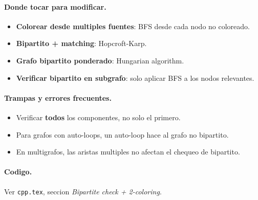 \paragraph{Donde tocar para modificar.}
\begin{itemize}\setlength\itemsep{0pt}
	\item \textbf{Colorear desde multiples fuentes}: BFS desde cada nodo no coloreado.
	\item \textbf{Bipartito + matching}: Hopcroft-Karp.
	\item \textbf{Grafo bipartito ponderado}: Hungarian algorithm.
	\item \textbf{Verificar bipartito en subgrafo}: solo aplicar BFS a los nodos relevantes.
\end{itemize}

\paragraph{Trampas y errores frecuentes.}
\begin{itemize}\setlength\itemsep{0pt}
	\item Verificar \textbf{todos} los componentes, no solo el primero.
	\item Para grafos con auto-loops, un auto-loop hace al grafo no bipartito.
	\item En multigrafos, las aristas multiples no afectan el chequeo de bipartito.
\end{itemize}

\paragraph{Codigo.}
Ver \texttt{cpp.tex}, seccion \textit{Bipartite check + 2-coloring}.

\vspace{0.5em}
